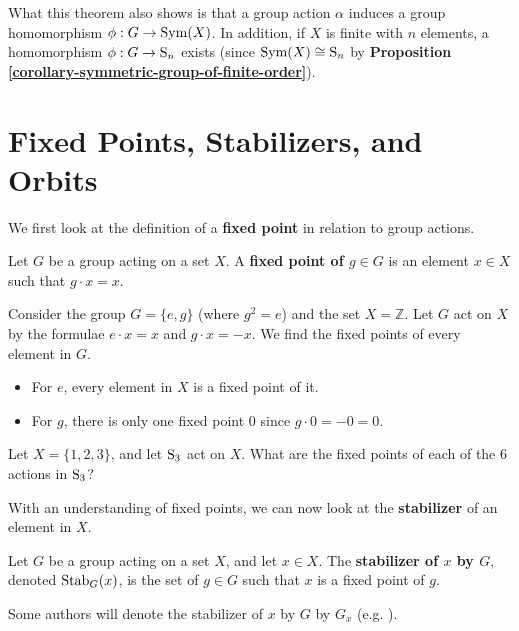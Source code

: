 \begin{remark}
    What this theorem also shows is that a group action $\alpha$ induces a group homomorphism $\phi: G \to \mathrm{Sym}(X)$. In addition, if $X$ is finite with $n$ elements, a homomorphism $\phi: G \to \mathrm{S}_{n}$ exists (since $\mathrm{Sym}(X) \cong \mathrm{S}_{n}$ by \textbf{Proposition \ref{corollary-symmetric-group-of-finite-order}}).
\end{remark}

\section{Fixed Points, Stabilizers, and Orbits}
We first look at the definition of a \textbf{fixed point} in relation to group actions.

\begin{definition}
    Let $G$ be a group acting on a set $X$. A \textbf{fixed point of $g \in G$} is an element $x \in X$ such that $g\cdot x = x$.
\end{definition}

\begin{example}
    Consider the group $G = \{e, g\}$ (where $g^2 = e$) and the set $X = \mathbb{Z}$. Let $G$ act on $X$ by the formulae $e\cdot x = x$ and $g\cdot x = -x$. We find the fixed points of every element in $G$.
    \begin{itemize}
        \item For $e$, every element in $X$ is a fixed point of it.
        \item For $g$, there is only one fixed point 0 since $g\cdot 0 = -0 = 0$.
    \end{itemize}
\end{example}

\begin{exercise}
    Let $X = \{1, 2, 3\}$, and let $\mathrm{S}_{3}$ act on $X$. What are the fixed points of each of the 6 actions in $\mathrm{S}_{3}$?
\end{exercise}

With an understanding of fixed points, we can now look at the \textbf{stabilizer} of an element in $X$.

\begin{definition}
    Let $G$ be a group acting on a set $X$, and let $x \in X$. The \textbf{stabilizer of $x$ by $G$}, denoted $\mathrm{Stab}_{G}(x)$, is the set of $g \in G$ such that $x$ is a fixed point of $g$.
\end{definition}
\begin{remark}
    Some authors will denote the stabilizer of $x$ by $G$ by $G_x$ (e.g. \cite{clark_1984, humphreys_1996, brilliant_groupactions}).
\end{remark}

